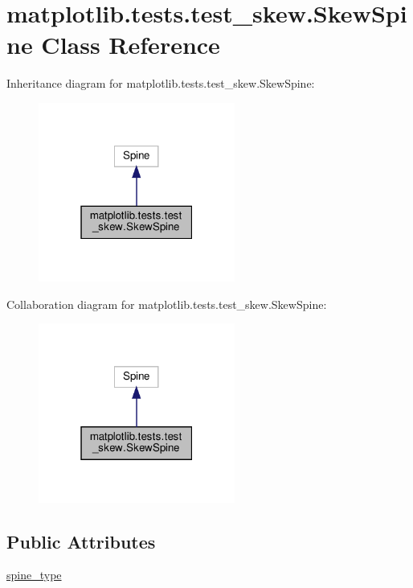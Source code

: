 \hypertarget{classmatplotlib_1_1tests_1_1test__skew_1_1SkewSpine}{}\section{matplotlib.\+tests.\+test\+\_\+skew.\+Skew\+Spine Class Reference}
\label{classmatplotlib_1_1tests_1_1test__skew_1_1SkewSpine}


Inheritance diagram for matplotlib.\+tests.\+test\+\_\+skew.\+Skew\+Spine\+:
\nopagebreak
\begin{figure}[H]
\begin{center}
\leavevmode
\includegraphics[width=183pt]{classmatplotlib_1_1tests_1_1test__skew_1_1SkewSpine__inherit__graph}
\end{center}
\end{figure}


Collaboration diagram for matplotlib.\+tests.\+test\+\_\+skew.\+Skew\+Spine\+:
\nopagebreak
\begin{figure}[H]
\begin{center}
\leavevmode
\includegraphics[width=183pt]{classmatplotlib_1_1tests_1_1test__skew_1_1SkewSpine__coll__graph}
\end{center}
\end{figure}
\subsection*{Public Attributes}
\begin{DoxyCompactItemize}
\item 
\hyperlink{classmatplotlib_1_1tests_1_1test__skew_1_1SkewSpine_ae576658da51536a99f0075dc32221992}{spine\+\_\+type}
\end{DoxyCompactItemize}


